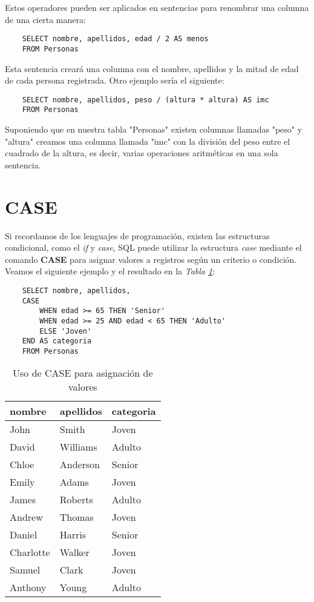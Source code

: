 Estos operadores pueden ser aplicados en sentencias para renombrar una columna de una cierta manera:
\begin{lstlisting}
    SELECT nombre, apellidos, edad / 2 AS menos
    FROM Personas
\end{lstlisting}

Esta sentencia creará una columna con el nombre, apellidos y la mitad de edad de cada persona registrada. Otro ejemplo sería el siguiente:
\begin{lstlisting}
    SELECT nombre, apellidos, peso / (altura * altura) AS imc
    FROM Personas
\end{lstlisting}

Suponiendo que en nuestra tabla "Personas" existen columnas llamadas "peso" y "altura" creamos una columna llamada "imc" con la división del peso entre el cuadrado de la altura, es decir, varias operaciones aritméticas en una sola sentencia.



\section{CASE}

Si recordamos de los lenguajes de programación, existen las estructuras condicional, como el \textit{if} y \textit{case}, SQL puede utilizar la estructura \textit{case} mediante el comando \textbf{CASE} para asignar valores a registros según un criterio o condición. Veamos el siguiente ejemplo y el resultado en la \textit{Tabla \ref{tab: 30}}:
\begin{lstlisting}
    SELECT nombre, apellidos,
    CASE
        WHEN edad >= 65 THEN 'Senior'
        WHEN edad >= 25 AND edad < 65 THEN 'Adulto'
        ELSE 'Joven'
    END AS categoria
    FROM Personas
\end{lstlisting}
\begin{table}[H]
    \centering
    \caption{Uso de CASE para asignación de valores}
    \label{tab: 30}
    \begin{tabular}{|l|l|l|}
        \hline
        \textbf{nombre} & \textbf{apellidos} & \textbf{categoria} \\
        \hline
        John        & Smith     & Joven \\
        \hline
        David       & Williams  & Adulto \\
        \hline
        Chloe       & Anderson  & Senior \\
        \hline
        Emily       & Adams     & Joven \\
        \hline
        James       & Roberts   & Adulto \\
        \hline
        Andrew      & Thomas    & Joven \\
        \hline
        Daniel      & Harris    & Senior \\
        \hline
        Charlotte   & Walker    & Joven \\
        \hline
        Samuel      & Clark     & Joven \\
        \hline
        Anthony     & Young     & Adulto \\
        \hline
    \end{tabular}
\end{table}

